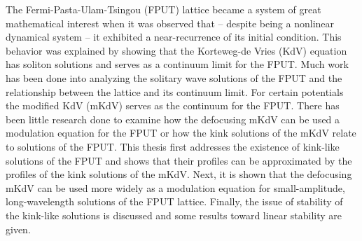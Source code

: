 
The Fermi-Pasta-Ulam-Tsingou (FPUT) lattice became a system of great mathematical interest when it was observed that -- despite being a nonlinear dynamical system -- it exhibited a near-recurrence of its initial condition. This behavior was explained by showing that the Korteweg-de Vries (KdV) equation has soliton solutions and serves as a continuum limit for the FPUT. Much work has been done into analyzing the solitary wave solutions of the FPUT and the relationship between the lattice and its continuum limit. For certain potentials the modified KdV (mKdV) serves as the continuum for the FPUT. There has been little research done to examine how the defocusing mKdV can be used a modulation equation for the FPUT or how the kink solutions of the mKdV relate to solutions of the FPUT. This thesis first addresses the existence of kink-like solutions of the FPUT and shows that their profiles can be approximated by the profiles of the kink solutions of the mKdV. Next, it is shown that the defocusing mKdV can be used more widely as a modulation equation for small-amplitude, long-wavelength solutions of the FPUT lattice. Finally, the issue of stability of the kink-like solutions is discussed and some results toward linear stability are given.
